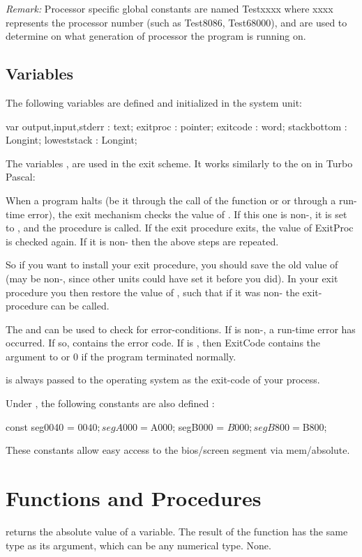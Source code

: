 \documentclass{report}
\begin{document}
\emph{ Remark: } Processor specific global constants are named Testxxxx
where xxxx represents the processor number (such as Test8086, Test68000),
and are used to determine on what generation of processor the program
is running on.

\subsection{Variables}
The following variables are defined and initialized in the system unit:
\begin{listing}
var
  output,input,stderr : text;
  exitproc : pointer;
  exitcode : word;
  stackbottom : Longint;
  loweststack : Longint;
\end{listing}
The variables ,  are used in the \fpc exit
scheme. It works similarly to the on in Turbo Pascal:

When a program halts (be it through the call of the  function or
 or through a run-time error), the exit mechanism checks the value
of . If this one is non-, it is set to , and
the procedure is called. If the exit procedure exits, the value of ExitProc
is checked again. If it is non- then the above steps are repeated.

So if you want to install your exit procedure, you should save the old value
of  (may be non-, since other units could have set it before 
you did). In your exit procedure you then restore the value of
, such that if it was non- the exit-procedure can be
called.

The  and  can be used to check for
error-conditions. If  is non-, a run-time error has
occurred. If so,  contains the error code. If  is
, then {ExitCode} contains the argument to  or 0 if the
program terminated normally.

 is always passed to the operating system as the exit-code of
your process.

Under , the following constants are also defined :
\begin{listing}
const
   seg0040 = $0040;
   segA000 = $A000;
   segB000 = $B000;
   segB800 = $B800;
\end{listing}
These constants allow easy access to the bios/screen segment via mem/absolute.

\section{Functions and Procedures}
{ returns the absolute value of a variable. The result of the
function has the same type as its argument, which can be any numerical
type.}
{None.}
{}
\end{document}
